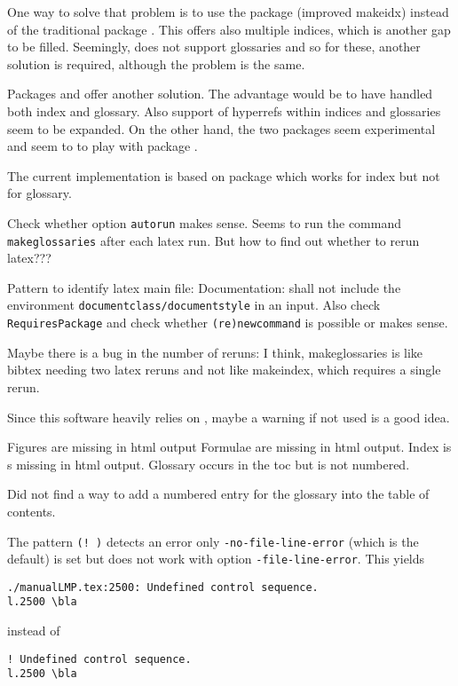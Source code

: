\documentclass[12pt]{book}
\begin{document}
One way to solve that problem is to use the package  
(improved makeidx) instead of the traditional package . 
This offers also multiple indices, which is another gap to be filled. 
Seemingly,  does not support glossaries 
and so for these, another solution is required, 
although the problem is the same. 

Packages  and  
offer another solution. 
The advantage would be to have handled both index and glossary. 
Also support of hyperrefs within indices and glossaries seem to be expanded. 
On the other hand, the two packages seem experimental 
and seem to to play with package . 

The current implementation is based on package  
which works for index but not for glossary. 

Check whether  option \texttt{autorun} makes sense. 
Seems to run the command \texttt{makeglossaries} after each latex run. 
But how to find out whether to rerun latex??? 

Pattern to identify latex main file: 
Documentation: shall not include the environment 
\texttt{documentclass/documentstyle} in an input. 
Also check \texttt{RequiresPackage} 
and check whether \texttt{(re)newcommand} is possible %
or makes sense. 

Maybe there is a bug in the number of reruns: 
I think, makeglossaries is like bibtex needing two latex reruns 
and not like makeindex, which requires a single rerun. 

Since this software heavily relies on , 
maybe a warning if not used is a good idea. 

Figures are missing in html output 
Formulae are missing in html output. 
Index is s missing in html output. 
Glossary occurs in the toc but is not numbered. 

Did not find a way to add a numbered entry for the glossary 
into the table of contents. 

The pattern \texttt{(!\ )} detects an error only %
\texttt{-no-file-line-error} (which is the default) is set 
but does not work with option \texttt{-file-line-error}. 
This yields 
%
\begin{verbatim}
./manualLMP.tex:2500: Undefined control sequence.
l.2500 \bla
\end{verbatim}
%
instead of 
%
\begin{verbatim}
! Undefined control sequence.
l.2500 \bla
\end{verbatim}
\end{document}
